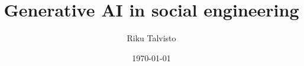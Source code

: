 \documentclass[english,twoside,censored,tkt]{HYthesisML}
\title{Generative AI in social engineering}
\author{Riku Talvisto}
\date{\today}
\begin{document}
\maketitle




\mytableofcontents

\mainmatter















{}  %
\printbibliography
  



\backmatter

\begin{appendices}

%






\end{appendices}
\end{document}
